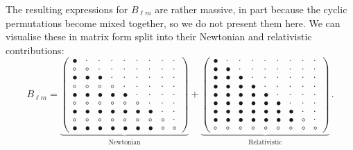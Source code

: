 The resulting expressions for $B_{\ell m}$ are rather massive, in part because the cyclic permutations become mixed together, so we do not present them here. We can visualise these in matrix form split into their Newtonian and relativistic contributions:
\begin{equation} \label{eq:blm_newtrelmatrix}
B_{\ell m}=
 \underbrace{\left( \begin {array}{ccccccccc} \bullet& \cdot  &  \cdot& \cdot  &  \cdot& \cdot  &  \cdot& \cdot  &  \cdot
\\  \circ & \circ  &  \cdot& \cdot  &  \cdot& \cdot  &  \cdot& \cdot  &  \cdot \\ \bullet&\bullet&\bullet& \cdot  &  \cdot& \cdot 
& \cdot  &  \cdot& \cdot \\  \circ & \circ  &  \circ& \circ  &  \cdot& \cdot  &  \cdot& \cdot  & \cdot \\ \bullet&\bullet&\bullet
&\bullet&\bullet& \cdot  &  \cdot& \cdot  & \cdot \\ \circ  & \circ  &  \circ& \circ  &  \circ& \circ  &  \cdot& \cdot  & \cdot 
\\ \bullet&\bullet&\bullet&\bullet&\bullet&\bullet&\bullet& \cdot  &  \cdot  \\ \circ  & \circ  &  \circ& \circ  &  \circ&  
\circ & \circ  &  \circ & \cdot \\ \bullet&\bullet&\bullet&\bullet&\bullet&\bullet&\bullet& \circ & \circ \end {array} \right)}_\text{Newtonian}
+
\underbrace{\left( \begin {array}{ccccccccc} \bullet&  \cdot&\cdot  &  \cdot&\cdot  &  \cdot&\cdot  &  \cdot&  \cdot
\\  \bullet&\bullet&  \cdot&\cdot  &  \cdot&\cdot  &  \cdot&\cdot  &  \cdot
\\  \bullet&\bullet&\bullet&  \cdot&\cdot  &  \cdot&\cdot  &  \cdot&  \cdot
\\  \bullet&\bullet&\bullet&\bullet&  \cdot&\cdot  &  \cdot&\cdot  &  \cdot
\\  \bullet&\bullet&\bullet&\bullet&\bullet&  \cdot&\cdot  &  
\cdot & \cdot \\  \bullet&\bullet&\bullet&\bullet&\bullet& \bullet &  \cdot&\cdot  & \cdot \\  \bullet&\bullet&\bullet&\bullet&
\bullet&\bullet&\bullet&  \cdot&  \cdot \\  \bullet&\bullet& \bullet &\bullet&\bullet&\bullet&\bullet& \circ & \cdot \\  \circ  & \circ 
&  \circ&\circ  &  \circ&\circ  &  \circ&\circ  & \circ \end {array} \right)}_\text{Relativistic}\,.
\end{equation}
